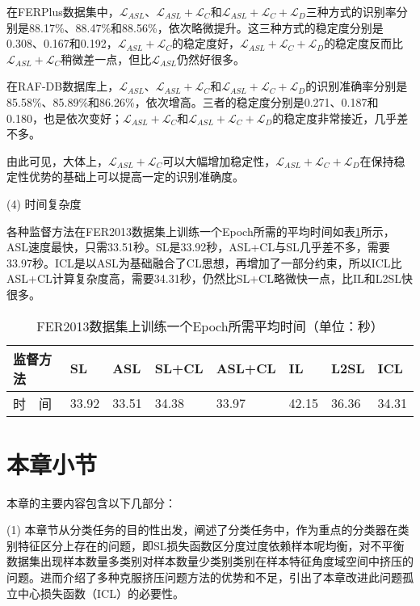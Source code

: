 在FERPlus数据集中，$\mathcal{L}_{ASL}$、$\mathcal{L}_{ASL}+\mathcal{L}_C$和$\mathcal{L}_{ASL}+\mathcal{L}_C+\mathcal{L}_D$三种方式的识别率分别是88.17\%、88.47\%和88.56\%，依次略微提升。这三种方式的稳定度分别是0.308、0.167和0.192，$\mathcal{L}_{ASL}+\mathcal{L}_C$的稳定度好，$\mathcal{L}_{ASL}+\mathcal{L}_C+\mathcal{L}_D$的稳定度反而比$\mathcal{L}_{ASL}+\mathcal{L}_C$稍微差一点，但比$\mathcal{L}_{ASL}$仍然好很多。

在RAF-DB数据库上，$\mathcal{L}_{ASL}$、$\mathcal{L}_{ASL}+\mathcal{L}_C$和$\mathcal{L}_{ASL}+\mathcal{L}_C+\mathcal{L}_D$的识别准确率分别是85.58\%、85.89\%和86.26\%，依次增高。三者的稳定度分别是0.271、0.187和0.180，也是依次变好；$\mathcal{L}_{ASL}+\mathcal{L}_C$和$\mathcal{L}_{ASL}+\mathcal{L}_C+\mathcal{L}_D$的稳定度非常接近，几乎差不多。

由此可见，大体上，$\mathcal{L}_{ASL}+\mathcal{L}_C$可以大幅增加稳定性，$\mathcal{L}_{ASL}+\mathcal{L}_C+\mathcal{L}_D$在保持稳定性优势的基础上可以提高一定的识别准确度。

(4)	时间复杂度

各种监督方法在FER2013数据集上训练一个Epoch所需的平均时间如表\ref{表4.6}所示，ASL速度最快，只需33.51秒。SL是33.92秒，ASL+CL与SL几乎差不多，需要33.97秒。ICL是以ASL为基础融合了CL思想，再增加了一部分约束，所以ICL比ASL+CL计算复杂度高，需要34.31秒，仍然比SL+CL略微快一点，比IL和L2SL快很多。

\begin{table}[!ht]
	\caption{FER2013数据集上训练一个Epoch所需平均时间（单位：秒）}
	\label{表4.6}
	\renewcommand{\arraystretch}{1.5}
	\centering
	\begin{tabular}{p{2cm}<{\centering}p{1.25cm}<{\centering}p{1.25cm}<{\centering}p{1.25cm}<{\centering}p{1.25cm}<{\centering}p{1.25cm}<{\centering}p{1.25cm}<{\centering}p{1.25cm}<{\centering}}
		\bottomrule
		监督方法  & SL    & ASL   & SL+CL & ASL+CL & IL    & L2SL  & ICL   \\ \hline
		时\ \ 间 & 33.92 & 33.51 & 34.38 & 33.97  & 42.15 & 36.36 & 34.31 \\ \bottomrule
	\end{tabular}
\end{table}

\section{本章小节}


本章的主要内容包含以下几部分：

(1)	本章节从分类任务的目的性出发，阐述了分类任务中，作为重点的分类器在类别特征区分上存在的问题，即SL损失函数区分度过度依赖样本呢均衡，对不平衡数据集出现样本数量多类别对样本数量少类别类别在样本特征角度域空间中挤压的问题。进而介绍了多种克服挤压问题方法的优势和不足，引出了本章改进此问题孤立中心损失函数（ICL）的必要性。

